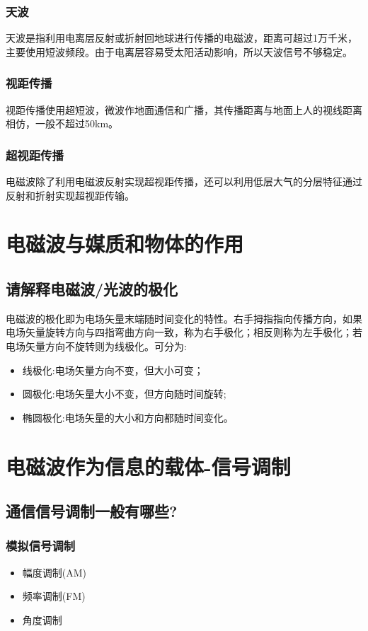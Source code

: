 \documentclass[UTF8]{ctexart}
\begin{document}
\subsubsection{天波}
天波是指利用电离层反射或折射回地球进行传播的电磁波，距离可超过1万千米，主要使用短波频段。由于电离层容易受太阳活动影响，所以天波信号不够稳定。
\subsubsection{视距传播}
视距传播使用超短波，微波作地面通信和广播，其传播距离与地面上人的视线距离相仿，一般不超过50km。
\subsubsection{超视距传播}
电磁波除了利用电磁波反射实现超视距传播，还可以利用低层大气的分层特征通过反射和折射实现超视距传输。
\section{电磁波与媒质和物体的作用}
\subsection{请解释电磁波/光波的极化}
电磁波的极化即为电场矢量末端随时间变化的特性。右手拇指指向传播方向，如果电场矢量旋转方向与四指弯曲方向一致，称为右手极化；相反则称为左手极化；若电场矢量方向不旋转则为线极化。可分为:
\begin{itemize}
  \item 线极化:电场矢量方向不变，但大小可变；
  \item 圆极化:电场矢量大小不变，但方向随时间旋转;
  \item 椭圆极化:电场矢量的大小和方向都随时间变化。
\end{itemize}

\section{电磁波作为信息的载体-信号调制}
\subsection{通信信号调制一般有哪些?}
\subsubsection{模拟信号调制}
\begin{itemize}
\item 幅度调制(AM)
\item 频率调制(FM)
\item  角度调制
\end{itemize}
\end{document}

